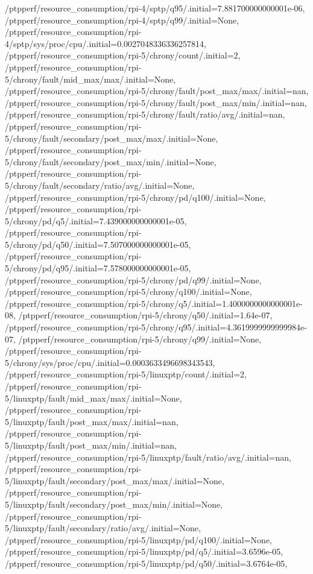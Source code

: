{    /ptpperf/resource_consumption/rpi-4/sptp/q95/.initial=7.881700000000001e-06,
    /ptpperf/resource_consumption/rpi-4/sptp/q99/.initial=None,
    /ptpperf/resource_consumption/rpi-4/sptp/sys/proc/cpu/.initial=0.0027048336336257814,
    /ptpperf/resource_consumption/rpi-5/chrony/count/.initial=2,
    /ptpperf/resource_consumption/rpi-5/chrony/fault/mid_max/max/.initial=None,
    /ptpperf/resource_consumption/rpi-5/chrony/fault/post_max/max/.initial=nan,
    /ptpperf/resource_consumption/rpi-5/chrony/fault/post_max/min/.initial=nan,
    /ptpperf/resource_consumption/rpi-5/chrony/fault/ratio/avg/.initial=nan,
    /ptpperf/resource_consumption/rpi-5/chrony/fault/secondary/post_max/max/.initial=None,
    /ptpperf/resource_consumption/rpi-5/chrony/fault/secondary/post_max/min/.initial=None,
    /ptpperf/resource_consumption/rpi-5/chrony/fault/secondary/ratio/avg/.initial=None,
    /ptpperf/resource_consumption/rpi-5/chrony/pd/q100/.initial=None,
    /ptpperf/resource_consumption/rpi-5/chrony/pd/q5/.initial=7.439000000000001e-05,
    /ptpperf/resource_consumption/rpi-5/chrony/pd/q50/.initial=7.507000000000001e-05,
    /ptpperf/resource_consumption/rpi-5/chrony/pd/q95/.initial=7.578000000000001e-05,
    /ptpperf/resource_consumption/rpi-5/chrony/pd/q99/.initial=None,
    /ptpperf/resource_consumption/rpi-5/chrony/q100/.initial=None,
    /ptpperf/resource_consumption/rpi-5/chrony/q5/.initial=1.4000000000000001e-08,
    /ptpperf/resource_consumption/rpi-5/chrony/q50/.initial=1.64e-07,
    /ptpperf/resource_consumption/rpi-5/chrony/q95/.initial=4.3619999999999984e-07,
    /ptpperf/resource_consumption/rpi-5/chrony/q99/.initial=None,
    /ptpperf/resource_consumption/rpi-5/chrony/sys/proc/cpu/.initial=0.0003633496698343543,
    /ptpperf/resource_consumption/rpi-5/linuxptp/count/.initial=2,
    /ptpperf/resource_consumption/rpi-5/linuxptp/fault/mid_max/max/.initial=None,
    /ptpperf/resource_consumption/rpi-5/linuxptp/fault/post_max/max/.initial=nan,
    /ptpperf/resource_consumption/rpi-5/linuxptp/fault/post_max/min/.initial=nan,
    /ptpperf/resource_consumption/rpi-5/linuxptp/fault/ratio/avg/.initial=nan,
    /ptpperf/resource_consumption/rpi-5/linuxptp/fault/secondary/post_max/max/.initial=None,
    /ptpperf/resource_consumption/rpi-5/linuxptp/fault/secondary/post_max/min/.initial=None,
    /ptpperf/resource_consumption/rpi-5/linuxptp/fault/secondary/ratio/avg/.initial=None,
    /ptpperf/resource_consumption/rpi-5/linuxptp/pd/q100/.initial=None,
    /ptpperf/resource_consumption/rpi-5/linuxptp/pd/q5/.initial=3.6596e-05,
    /ptpperf/resource_consumption/rpi-5/linuxptp/pd/q50/.initial=3.6764e-05,
}
